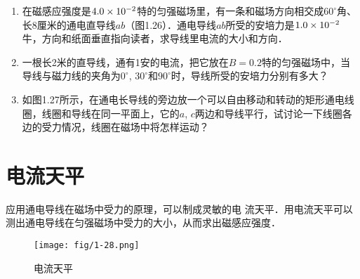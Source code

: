 \begin{enumerate}
\begin{figure}[htp]
\centering
\begin{minipage}[t]{0.48\textwidth}
\centering
{}
\caption{}
\end{minipage}
\begin{minipage}[t]{0.48\textwidth}
\centering
{}
\caption{}
\end{minipage}
\end{figure}



    \item 在磁感应强度是$4.0\times10^{-2}$特的匀强磁场里，有一条和磁场方向相交成$60^\circ$角、长8厘米的通电直导线$ab$（图1.26）．通电导线$ab$所受的安培力是$1.0\times10^{-2}$牛，方向和纸面垂直指向读者，求导线里电流的大小和方向．
    \item 一根长2米的直导线，通有1安的电流，把它放在$B=0.2$特的匀强磁场中，当导线与磁力线的夹角为$0^\circ$, $30^\circ$和$90^\circ$时，导线所受的安培力分别有多大？

    \item 如图1.27所示，在通电长导线的旁边放一个可以自由移动和转动的矩形通电线圈，线圈和导线在同一平面上，它的$a$, $c$两边和导线平行，试讨论一下线圈各边的受力情况，线圈在磁场中将怎样运动？
\end{enumerate}

\section{电流天平}
应用通电导线在磁场中受力的原理，可以制成灵敏的电
流天平．用电流天平可以测出通电导线在匀强磁场中受力的大小，从而求出磁感应强度．
    \begin{figure}[htp]\centering
	\texttt{[image: fig/1-28.png]}
	\caption{电流天平}
\end{figure}

